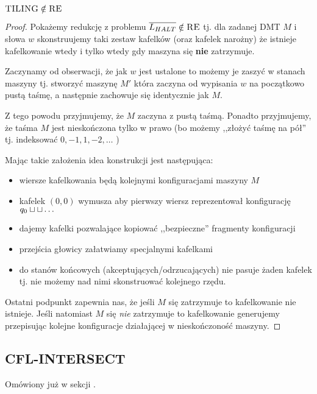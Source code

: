 \begin{theorem}
	\( \textsc{TILING} \notin \textsc{RE} \)
\end{theorem}
\begin{proof}
	Pokażemy redukcję z problemu \( \overline{L_{HALT}} \notin \textsc{RE} \) tj. dla zadanej DMT \( M \) i słowa \( w \) skonstruujemy taki zestaw kafelków (oraz kafelek narożny) że istnieje kafelkowanie wtedy i tylko wtedy gdy maszyna się \textbf{nie} zatrzymuje.

	Zaczynamy od obserwacji, że jak \( w \) jest ustalone to możemy je zaszyć w stanach maszyny tj. stworzyć maszynę \( M' \) która zaczyna od wypisania \( w \) na początkowo pustą taśmę, a następnie zachowuje się identycznie jak \( M \).

	Z tego powodu przyjmujemy, że \( M \) zaczyna z pustą taśmą. Ponadto przyjmujemy, że taśma \( M \) jest nieskończona tylko w prawo (bo możemy ,,złożyć taśmę na pół'' tj. indeksować \( 0, -1, 1, -2, \dots \) )

	Mając takie założenia idea konstrukcji jest następująca:
	\begin{itemize}
		\item wiersze kafelkowania będą kolejnymi konfiguracjami maszyny \( M \)
		\item kafelek \( (0, 0) \) wymusza aby pierwszy wiersz reprezentował konfigurację \( q_0 \sqcup \sqcup \dots \)
		\item dajemy kafelki pozwalające kopiować ,,bezpieczne'' fragmenty konfiguracji
		\item przejścia głowicy załatwiamy specjalnymi kafelkami
		\item do stanów końcowych (akceptujących/odrzucających) nie pasuje żaden kafelek tj. nie możemy nad nimi skonstruować kolejnego rzędu.
	\end{itemize}

	Ostatni podpunkt zapewnia nas, że jeśli \( M \) się zatrzymuje to kafelkowanie nie istnieje.
	Jeśli natomiast \( M \) się \textit{nie} zatrzymuje to kafelkowanie generujemy przepisując kolejne konfiguracje działającej w nieskończoność maszyny.

\end{proof}

\subsection{CFL-INTERSECT}

Omówiony już w sekcji .